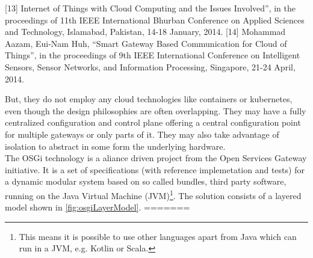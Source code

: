 [13] Internet of Things with Cloud Computing and the Issues Involved”, in
the proceedings of 11th IEEE International Bhurban Conference on
Applied Sciences and Technology, Islamabad, Pakistan, 14-18 January,
2014.
[14] Mohammad Aazam, Eui-Nam Huh, “Smart Gateway Based
Communication for Cloud of Things”, in the proceedings of 9th IEEE
International Conference on Intelligent Sensors, Sensor Networks, and
Information Processing, Singapore, 21-24 April, 2014.


But, they do not employ any cloud technologies like containers or kubernetes, even though the design philosophies are often overlapping. They may have a fully centralized configuration and control plane offering a central configuration point for multiple gateways or only parts of it. They may also take advantage of isolation to abstract in some form the underlying hardware.\\
The OSGi technology\cite{osgiDefintion25:online} is a aliance driven project from the Open Services Gateway initiative. It is a set of specifications (with reference implemetation and tests) for a dynamic modular system based on so called bundles, third party software, running on the Java Virtual Machine (JVM)\footnote{This means it is possible to use other languages apart from Java which can run in a JVM, e.g. Kotlin or Scala.}. The solution consists of a layered model shown in \cref{fig:osgiLayerModel}. 
=======
